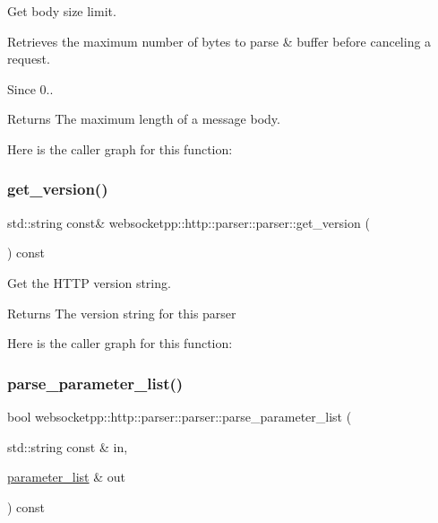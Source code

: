 Get body size limit. 

Retrieves the maximum number of bytes to parse \& buffer before canceling a request.

\begin{DoxySince}{Since}
0..
\end{DoxySince}
\begin{DoxyReturn}{Returns}
The maximum length of a message body. 
\end{DoxyReturn}
Here is the caller graph for this function\+:
\mbox{\label{classwebsocketpp_1_1http_1_1parser_1_1parser_a6dbb56d657bca4ee492f3b07a579c341}} 
\subsubsection{\texorpdfstring{get\+\_\+version()}{get\_version()}}
{\footnotesize\ttfamily std\+::string const\& websocketpp\+::http\+::parser\+::parser\+::get\+\_\+version (\begin{DoxyParamCaption}{ }\end{DoxyParamCaption}) const\hspace{0.3cm}{\ttfamily [inline]}}



Get the H\+T\+TP version string. 

\begin{DoxyReturn}{Returns}
The version string for this parser 
\end{DoxyReturn}
Here is the caller graph for this function\+:
\mbox{\label{classwebsocketpp_1_1http_1_1parser_1_1parser_af903e5538e362d9ac0aeaea3064aed0c}} 
\subsubsection{\texorpdfstring{parse\+\_\+parameter\+\_\+list()}{parse\_parameter\_list()}}
{\footnotesize\ttfamily bool websocketpp\+::http\+::parser\+::parser\+::parse\+\_\+parameter\+\_\+list (\begin{DoxyParamCaption}\item[{std\+::string const \&}]{in,  }\item[{\mbox{\hyperlink{namespacewebsocketpp_1_1http_a2c285bc959df5a63bf962bed842fccfb}{parameter\+\_\+list}} \&}]{out }\end{DoxyParamCaption}) const\hspace{0.3cm}{\ttfamily [inline]}}



